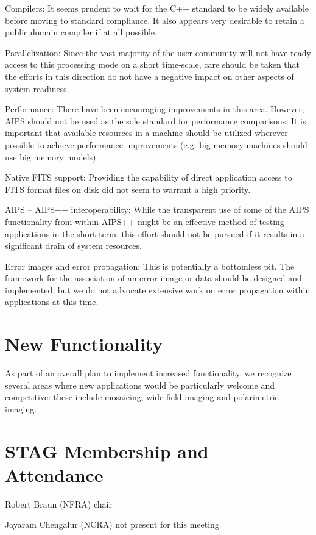 Compilers: It seems prudent to wait for the C++ standard to be widely
available before moving to standard compliance. It also appears very
desirable to retain a public domain compiler if at all possible.

Parallelization: Since the vast majority of the user community will
not have ready access to this processing mode on a short time-scale,
care should be taken that the efforts in this direction do not have a
negative impact on other aspects of system readiness.

Performance: There have been encouraging improvements in this area.
However, AIPS should not be used as the sole standard for performance
comparisons. It is important that available resources in a machine
should be utilized wherever possible to achieve performance improvements
(e.g. big memory machines should use big memory models).

Native FITS support: Providing the capability of direct application
access to FITS format files on disk did not seem to warrant a high
priority. 

AIPS -- AIPS++ interoperability: While the transparent use of some of
the AIPS functionality from within AIPS++ might be an effective method
of testing applications in the short term, this effort should not be
pursued if it results in a significant drain of system resources.

Error images and error propagation: This is potentially a bottomless
pit. The framework for the association of an error image or data
should be designed and implemented, but we do not advocate extensive
work on error propagation within applications at this time.

\section{New Functionality}

As part of an overall plan to implement increased functionality, we
recognize several areas where new applications would be
particularly welcome and competitive: these include mosaicing, wide
field imaging and polarimetric imaging.

\section{STAG Membership and Attendance}
\parindent=0cm

Robert Braun (NFRA) chair

Jayaram Chengalur (NCRA) not present for this meeting

